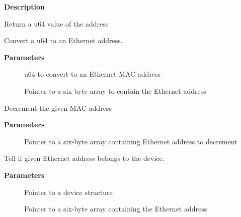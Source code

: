 \documentclass[a4paper,8pt,english]{sphinxmanual}
\begin{document}
\textbf{Description}

Return a u64 value of the address

\begin{fulllineitems}
\label{networking/kapi:c.u64_to_ether_addr}
Convert a u64 to an Ethernet address.

\end{fulllineitems}


\textbf{Parameters}
\begin{description}
\item[{}] \leavevmode
u64 to convert to an Ethernet MAC address

\item[{}] \leavevmode
Pointer to a six-byte array to contain the Ethernet address

\end{description}

\begin{fulllineitems}
\label{networking/kapi:c.eth_addr_dec}
Decrement the given MAC address

\end{fulllineitems}


\textbf{Parameters}
\begin{description}
\item[{}] \leavevmode
Pointer to a six-byte array containing Ethernet address to decrement

\end{description}

\begin{fulllineitems}
\label{networking/kapi:c.is_etherdev_addr}
Tell if given Ethernet address belongs to the device.

\end{fulllineitems}


\textbf{Parameters}
\begin{description}
\item[{}] \leavevmode
Pointer to a device structure

\item[{}] \leavevmode
Pointer to a six-byte array containing the Ethernet address

\end{description}
\end{document}
